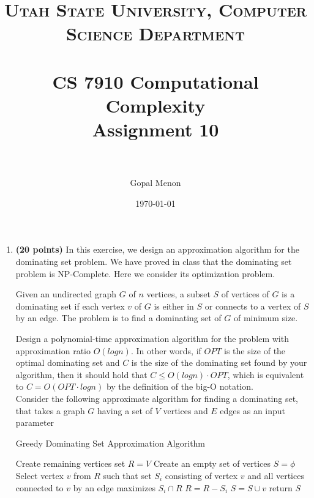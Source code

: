 \documentclass[paper=a4, fontsize=11pt]{scrartcl} %
\title{	
\normalfont \normalsize 
\textsc{Utah State University, Computer Science Department} \\ [25pt] %
\horrule{0.5pt} \\[0.4cm] %
\huge CS 7910 Computational Complexity\\Assignment 10\\ %
\horrule{2pt} \\[0.5cm] %
}
\author{Gopal Menon} %
\date{\normalsize\today} %
\numberwithin{figure}{section} %
\numberwithin{table}{section} %
\begin{document}
\maketitle %

\begin{enumerate}
\item \textbf{(20 points)} In this exercise, we design an approximation algorithm for the dominating set
problem. We have proved in class that the dominating set problem is NP-Complete. Here we consider its optimization problem.

Given an undirected graph $G$ of $n$ vertices, a subset $S$ of vertices of $G$ is a dominating set if
each vertex $v$ of $G$ is either in $S$ or connects to a vertex of $S$ by an edge. The problem is to
find a dominating set of $G$ of minimum size.

Design a polynomial-time approximation algorithm for the problem with approximation ratio
$O(log n)$. In other words, if $OPT$ is the size of the optimal dominating set and $C$ is the size
of the dominating set found by your algorithm, then it should hold that $C \leq O(log n) \cdot OP T$,
which is equivalent to $C = O(OPT \cdot log n)$ by the definition of the big-O notation.\\

Consider the following approximate algorithm for finding a dominating set, that takes a graph $G$ having a set of $V$ vertices and $E$ edges as an input parameter

\begin{minipage}{\linewidth}
  \begin{algorithm}[H]
    \caption{Greedy Dominating Set Approximation Algorithm}\label{DomSetApproxAlg}
    \begin{algorithmic}[1]
        \State Create remaining vertices set $R = V$
        \State Create an empty set of vertices $S = \phi$
          \State Select vertex $v$ from $R$ such that set $S_i$ consisting of vertex $v$    
          \State and all vertices connected to $v$ by an edge maximizes $S_i \cap R$
          \State $R = R - S_i$
          \State $S= S \cup v$
        \EndWhile
        \State return $S$
      \EndProcedure    \end{algorithmic}
  \end{algorithm}
\end{minipage}\\


\end{enumerate}
\end{document}
